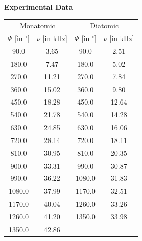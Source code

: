 \documentclass[varwidth,border=10pt]{standalone}
\begin{document}
\centering \small \textbf{Experimental Data}\\[1ex]
\begin{tabular}{cc|cc}
\toprule
\multicolumn{2}{c}{Monatomic} & \multicolumn{2}{c}{Diatomic} \\
$\Phi$ [in $^\circ$] & $\nu$ [in kHz] & $\Phi$ [in $^\circ$] & $\nu$ [in kHz] \\
\midrule
90.0 & 3.65 & 90.0 & 2.51 \\
180.0 & 7.47 & 180.0 & 5.02 \\
270.0 & 11.21 & 270.0 & 7.84 \\
360.0 & 15.02 & 360.0 & 9.80 \\
450.0 & 18.28 & 450.0 & 12.64 \\
540.0 & 21.78 & 540.0 & 14.28 \\
630.0 & 24.85 & 630.0 & 16.06 \\
720.0 & 28.14 & 720.0 & 18.11 \\
810.0 & 30.95 & 810.0 & 20.35 \\
900.0 & 33.31 & 990.0 & 30.87 \\
990.0 & 36.22 & 1080.0 & 31.83 \\
1080.0 & 37.99 & 1170.0 & 32.51 \\
1170.0 & 40.04 & 1260.0 & 33.26 \\
1260.0 & 41.20 & 1350.0 & 33.98 \\
1350.0 & 42.86 & & \\
\bottomrule
\end{tabular}
\end{document}
